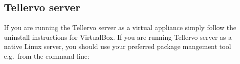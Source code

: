 \subsection{Tellervo server}


If you are running the Tellervo server as a virtual appliance simply follow the uninstall instructions for VirtualBox.  If you are running Tellervo server as a native Linux server, you should use your preferred package mangement tool e.g.\ from the command line:







